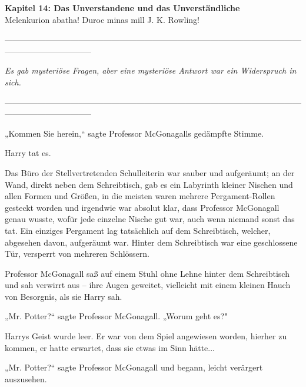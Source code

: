 

\hypertarget{das-unverstandene-und-das-unverstuxe4ndliche}{%

\textbf{Kapitel 14: Das Unverstandene und das Unverständliche}\\

\hfill\break Melenkurion abatha! Duroc minas mill J. K. Rowling!

--------------------------------------------------------------------------------------------------------------------------------------------

\hfill\break

\emph{Es gab mysteriöse Fragen, aber eine mysteriöse Antwort war ein Widerspruch in sich.}

\hfill\break

--------------------------------------------------------------------------------------------------------------------------------------------

\hfill\break „Kommen Sie herein,“ sagte Professor McGonagalls gedämpfte Stimme.

Harry tat es.

Das Büro der Stellvertretenden Schulleiterin war sauber und aufgeräumt; an der Wand, direkt neben dem Schreibtisch, gab es ein Labyrinth kleiner Nischen und allen Formen und Größen, in die meisten waren mehrere Pergament-Rollen gesteckt worden und irgendwie war absolut klar, dass Professor McGonagall genau wusste, wofür jede einzelne Nische gut war, auch wenn niemand sonst das tat. Ein einziges Pergament lag tatsächlich auf dem Schreibtisch, welcher, abgesehen davon, aufgeräumt war. Hinter dem Schreibtisch war eine geschlossene Tür, versperrt von mehreren Schlössern.

Professor McGonagall saß auf einem Stuhl ohne Lehne hinter dem Schreibtisch und sah verwirrt aus -- ihre Augen geweitet, vielleicht mit einem kleinen Hauch von Besorgnis, als sie Harry sah.

„Mr. Potter?“ sagte Professor McGonagall. „Worum geht es?"

Harrys Geist wurde leer. Er war von dem Spiel angewiesen worden, hierher zu kommen, er hatte erwartet, dass sie etwas im Sinn hätte...

„Mr. Potter?“ sagte Professor McGonagall und begann, leicht verärgert auszusehen.

}
